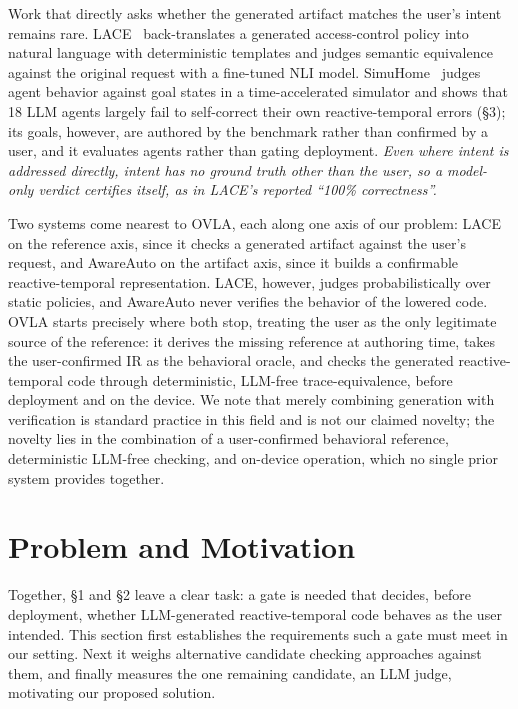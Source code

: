 \documentclass[sigconf,nonacm,anonymous,review]{acmart}
\begin{document}
Work that directly asks whether the generated artifact matches the user's intent remains rare. LACE~\cite{lace} back-translates a generated access-control policy into natural language with deterministic templates and judges semantic equivalence against the original request with a fine-tuned NLI model. SimuHome~\cite{simuhome} judges agent behavior against goal states in a time-accelerated simulator and shows that 18 LLM agents largely fail to self-correct their own reactive-temporal errors (\S3); its goals, however, are authored by the benchmark rather than confirmed by a user, and it evaluates agents rather than gating deployment. \emph{Even where intent is addressed directly, intent has no ground truth other than the user, so a model-only verdict certifies itself, as in LACE's reported ``100\% correctness''.}

Two systems come nearest to OVLA, each along one axis of our problem: LACE on the reference axis, since it checks a generated artifact against the user's request, and AwareAuto on the artifact axis, since it builds a confirmable reactive-temporal representation. LACE, however, judges probabilistically over static policies, and AwareAuto never verifies the behavior of the lowered code. OVLA starts precisely where both stop, treating the user as the only legitimate source of the reference: it derives the missing reference at authoring time, takes the user-confirmed IR as the behavioral oracle, and checks the generated reactive-temporal code through deterministic, LLM-free trace-equivalence, before deployment and on the device. We note that merely combining generation with verification is standard practice in this field and is not our claimed novelty; the novelty lies in the combination of a user-confirmed behavioral reference, deterministic LLM-free checking, and on-device operation, which no single prior system provides together.

\section{Problem and Motivation}

Together, \S1 and \S2 leave a clear task: a gate is needed that decides, before deployment, whether LLM-generated reactive-temporal code behaves as the user intended. This section first establishes the requirements such a gate must meet in our setting. Next it weighs alternative candidate checking approaches against them, and finally measures the one remaining candidate, an LLM judge, motivating our proposed solution. %
\end{document}
